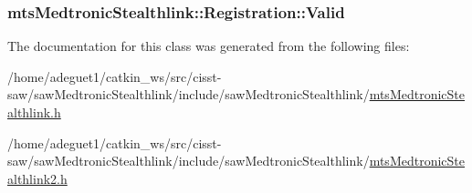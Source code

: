 \hypertarget{classmts_medtronic_stealthlink_1_1_registration_a1d7ccec8ab8b0fd47b0650496d328dfb}{
\subsubsection[{Valid}]{ mts\-Medtronic\-Stealthlink\-::\-Registration\-::\-Valid}}\label{classmts_medtronic_stealthlink_1_1_registration_a1d7ccec8ab8b0fd47b0650496d328dfb}


The documentation for this class was generated from the following files\-:\begin{DoxyCompactItemize}
\item 
/home/adeguet1/catkin\-\_\-ws/src/cisst-\/saw/saw\-Medtronic\-Stealthlink/include/saw\-Medtronic\-Stealthlink/\hyperlink{mts_medtronic_stealthlink_8h}{mts\-Medtronic\-Stealthlink.\-h}\item 
/home/adeguet1/catkin\-\_\-ws/src/cisst-\/saw/saw\-Medtronic\-Stealthlink/include/saw\-Medtronic\-Stealthlink/\hyperlink{mts_medtronic_stealthlink2_8h}{mts\-Medtronic\-Stealthlink2.\-h}\end{DoxyCompactItemize}
